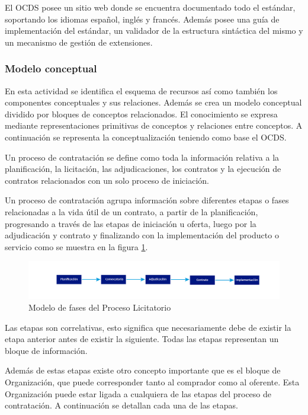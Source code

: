 El OCDS posee un sitio web donde se encuentra documentado todo el estándar, soportando los idiomas español, inglés y francés. Además posee una guía de implementación del estándar, un validador de la estructura sintáctica del mismo y un mecanismo de gestión de extensiones.

\subsubsection{Modelo conceptual}

En esta actividad se identifica el esquema de recursos así como también los componentes conceptuales y sus relaciones. Además se crea un modelo conceptual dividido por bloques de conceptos relacionados. El conocimiento se expresa mediante representaciones primitivas de conceptos y relaciones entre conceptos. A continuación se representa la conceptualización teniendo como base el OCDS.

Un proceso de contratación se define como toda la información relativa a la planificación, la licitación, las adjudicaciones, los contratos y la ejecución de contratos relacionados con un solo proceso de iniciación.

Un proceso de contratación agrupa información sobre diferentes etapas o fases relacionadas a la vida útil de un contrato, a partir de la planificación, progresando a través de las etapas de iniciación u oferta, luego por la adjudicación y contrato y finalizando con la implementación del producto o servicio como se muestra en la figura \ref{img:fases del proceso licitatorio }.

\begin{figure}[h!]
    \centering
    \includegraphics[width=150mm]{figuras/Diagramas_ProcesoLicitatorio.png}
    \caption{Modelo de fases del Proceso Licitatorio}
    \label{img:fases del proceso licitatorio }
\end{figure}

Las etapas son correlativas, esto significa que necesariamente debe de existir la etapa anterior antes de existir la siguiente. Todas las etapas representan un bloque de información.

Además de estas etapas existe otro concepto importante que es el bloque de Organización, que puede corresponder tanto al comprador como al oferente. Esta Organización puede estar ligada a cualquiera de las etapas del proceso de contratación. A continuación se detallan cada una de las etapas.

